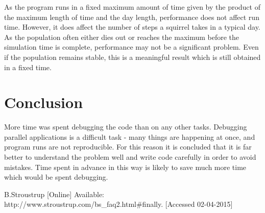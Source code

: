 \documentclass[11pt, oneside]{article}   %
\begin{document}
As the program runs in a fixed maximum amount of time given by the product of the maximum length of time and the day length, performance does not affect run time.
However, it does affect the number of steps a squirrel takes in a typical day. 
As the population often either dies out or reaches the maximum before the simulation time is complete, performance may not be a significant problem.
Even if the population remains stable, this is a meaningful result which is still obtained in a fixed time.

\section{Conclusion}

More time was spent debugging the code than on any other tasks.
Debugging parallel applications is a difficult task - many things are happening at once, and program runs are not reproducible.
For this reason it is concluded that it is far better to understand the problem well and write code carefully in order to avoid mistakes.
Time spent in advance in this way is likely to save much more time which would be spent debugging.

\newpage

\begin{thebibliography}{10}

 B.Stroustrup [Online] Available: http://www.stroustrup.com/bs\_faq2.html\#finally. [Accessed 02-04-2015]

\end{thebibliography}
\end{document}
